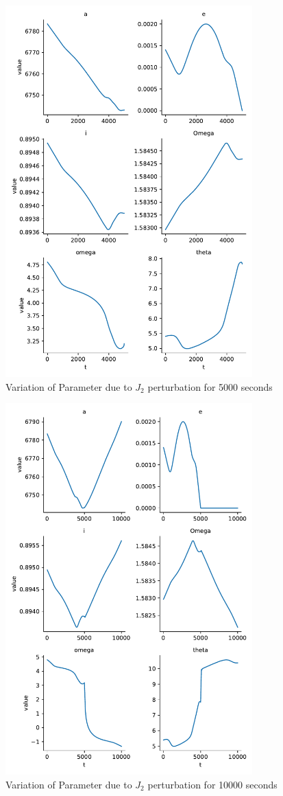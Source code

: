 \begin{figure}[H]
    \centering
    \includegraphics[width=0.85\textwidth]{../Figure/Q2/orbital_elements_5000.pdf}
    \caption{Variation of Parameter due to $J_2$ perturbation for 5000 seconds}
\end{figure}

\begin{figure}[H]
    \centering
    \includegraphics[width=0.85\textwidth]{../Figure/Q2/orbital_elements_10000.pdf}
    \caption{Variation of Parameter due to $J_2$ perturbation for 10000 seconds}
\end{figure}